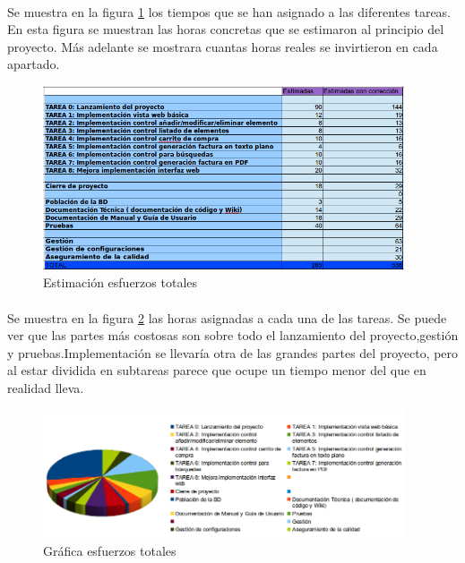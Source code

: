 
\paragraph{} Se muestra en la figura \ref{fig:6121} los tiempos que se han asignado a las diferentes tareas. En esta figura se muestran las horas concretas que se estimaron al principio del proyecto. Más adelante se mostrara cuantas horas reales se invirtieron en cada apartado.

\begin{figure}[h!]
\centering
\includegraphics[width=0.95\textwidth]{img/6121}
\caption{Estimación esfuerzos totales}
 \label{fig:6121}
\end{figure}

\paragraph{} Se muestra en la figura \ref{fig:6122} las horas asignadas a cada una de las tareas. Se puede ver que las partes más costosas son sobre todo el lanzamiento del proyecto,gestión y pruebas.Implementación se llevaría otra de las grandes partes del proyecto, pero al estar dividida en subtareas parece que ocupe un tiempo menor del que en realidad lleva.

\begin{figure}[h!]
\centering
\includegraphics[width=0.95\textwidth]{img/6122}
\caption{Gráfica esfuerzos totales}
 \label{fig:6122}
\end{figure}